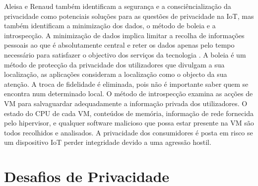 \documentclass[conference]{IEEEtran}
\begin{document}
Aleisa e Renaud \cite{aleisa2016privacy} também identificam a segurança e a
consciêncialização da privacidade como potenciais soluções para as questões de
privacidade na IoT, mas também identificam a minimização dos
dados, o método de boleia e a introspecção. A minimização de dados implica limitar a
recolha de informações pessoais ao que é absolutamente central e reter os
dados apenas pelo tempo necessário para satisfazer o objectivo dos serviços
da tecnologia \cite{ojDirective281}. A boleia \cite{tang2006putting} é um
método de protecção da privacidade dos utilizadores que divulgam a sua
localização, as aplicações consideram a localização como o objecto da sua
atenção. A troca de fidelidade é eliminada, pois não é importante saber
quem se encontra num determinado local. O método de introspecção \cite{kang2015protection}
examina as acções de VM para salvaguardar adequadamente a informação privada
dos utilizadores. O estado do CPU de cada VM, conteúdos de memória, informação
de rede fornecida pelo hipervisor, e qualquer software malicioso que possa
estar presente na VM são todos recolhidos e analisados. A privacidade dos
consumidores é posta em risco se um dispositivo IoT perder integridade devido
a uma agressão hostil.


\section{Desafios de Privacidade}
\end{document}
